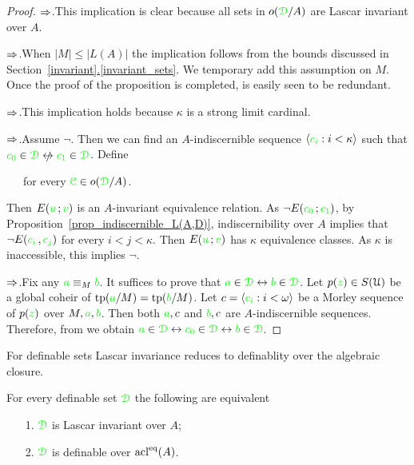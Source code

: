 \documentclass[creche.tex]{subfiles}
\begin{document}
\begin{proof}
  $\Rightarrow$.\quad This implication is clear because all sets in $o({\color{green}\EuScript D}/A)$ are Lascar invariant over $A$. 
  
  $\Rightarrow$.\quad When $|M|\le|L(A)|$ the implication follows from the bounds discussed in Section~\hyperref[invariant_sets]{\ref*{invariant}.\ref*{invariant_sets}}. We temporary add this assumption on $M$. Once the proof of the proposition is completed, is easily seen to be redundant. 
  
  $\Rightarrow$.\quad This implication holds because $\kappa$ is a strong limit cardinal.

  $\Rightarrow$.\quad Assume $\neg$. Then we can find an  $A\mbox{-}$indiscernible sequence $\langle{\color{green}c_i}:i<\kappa\rangle$ such that ${\gr c_0}\in\grD\niff {\gr c_1}\in\grD$. Define

  \ \ \ for every ${\color{green}\EuScript C}\in o({\color{green}\EuScript D}/A)$.

  Then $E({\color{green} u}\,;{\color{green} v})$ is an $A\mbox{-}$invariant equivalence relation. As $\neg E({\color{green} c_0}\,;{\color{green} c_1})$, by Proposition~\ref{prop_indiscernible_L(A,D)}, indiscernibility over $A$ implies that $\neg E({\color{green} c_i\,},{\color{green} c_j})$ for every $i<j<\kappa$. Then $E({\color{green} u}\,;{\color{green} v})$ has $\kappa$ equivalence classes. As $\kappa$ is inaccessible, this implies $\neg$.

  $\Rightarrow$.\quad Fix any ${\color{green} a}\equiv_M{\color{green} b}$. It suffices to prove that ${\color{green} a}\in{\color{green}\EuScript D}\leftrightarrow{\color{green}b}\in{\color{green}\EuScript D}$. Let $p({\color{green} z})\in S(\EuScript U)$ be a global coheir of ${\rm tp}({\color{green} a}/M)={\rm tp}({\color{green} b}/M)$. Let $c=\langle{\color{green}c_i}:i<\omega\rangle$ be a Morley sequence of $p({\color{green} z})$ over $M,{\color{green} a},{\color{green} b}$. Then both ${\color{green} a},c$ and ${\color{green} b},c$ are $A\mbox{-}$indiscernible sequences. Therefore, from  we obtain ${\color{green} a}\in{\color{green}\EuScript D}\leftrightarrow{\color{green}c_0}\in{\color{green}\EuScript D}\leftrightarrow{\color{green}b}\in{\color{green}\EuScript D}$. 
\end{proof}

For definable sets Lascar invariance reduces to definablity over the algebraic closure.

\begin{corollary}
For every definable set ${\color{green}\EuScript D}$ the following are equivalent
  \begin{itemize}
    \item[1.] ${\color{green}\EuScript D}$ is Lascar invariant over $A$;
    \item[2.] ${\color{green}\EuScript D}$ is definable over $\mathop{\rm acl}^{{\rm eq}}(A)$.\QED
  \end{itemize}
\end{corollary}
\end{document}

